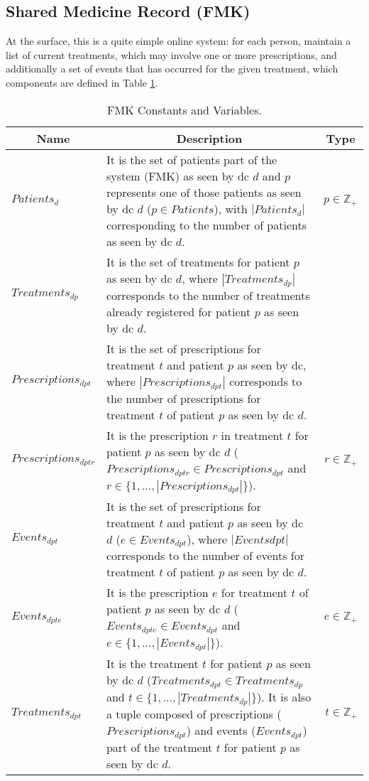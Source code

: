 \subsection{Shared Medicine Record (FMK)}
At the surface, this is a quite simple online system: for each person, maintain a list of current treatments, which may involve one or more prescriptions, and additionally a set of events that has occurred for the given treatment, which components are defined in Table \ref{tab:fmk_constants_variables}.
\begin{table}[!ht]
	\begin{tabular}{|p{2.5cm}|p{11cm}|r| }
		\hline
		\multicolumn{1}{|c|}{Name} & \multicolumn{1}{c|}{Description} & \multicolumn{1}{c|}{Type} \\
		\hline
		\hline
		$Patients_{d}$ & It is the set of patients part of the system (FMK) as seen by \gls{dc} $d$ and $p$ represents one of those patients as seen by \gls{dc} $d$ ($p \in Patients$), with $|Patients_{d}|$ corresponding to the number of patients as seen by \gls{dc} $d$. & $p \in \mathbb{Z}_{+}$ \\
		\hline
		$Treatments_{dp}$ & It is the set of treatments for patient $p$ as seen by \gls{dc} $d$, where $|Treatments_{dp}|$ corresponds to the number of treatments already registered for patient $p$ as seen by \gls{dc} $d$. &  \\
		\hline
		$Prescriptions_{dpt}$ & It is the set of prescriptions for treatment $t$ and patient $p$ as seen by \gls{dc}, where $|Prescriptions_{dpt}|$ corresponds to the number of prescriptions for treatment $t$ of patient $p$ as seen by \gls{dc} $d$. &  \\
		\hline
		$Prescriptions_{dptr}$ & It is the prescription $r$ in treatment $t$ for patient $p$ as seen by \gls{dc} $d$ ($Prescriptions_{dptr} \in Prescriptions_{dpt}$ and $r \in \{1,\dots, |Prescriptions_{dpt}|\}$). & $r \in \mathbb{Z}_{+}$ \\
		\hline
		$Events_{dpt}$ & It is the set of prescriptions for treatment $t$ and patient $p$ as seen by \gls{dc} $d$ ($e \in Events_{dpt}$), where $|Events{dpt}|$ corresponds to the number of events for treatment $t$ of patient $p$ as seen by \gls{dc} $d$. &  \\
		\hline
		$Events_{dpte}$ & It is the prescription $e$ for treatment $t$ of patient $p$ as seen by \gls{dc} $d$ ($Events_{dpte} \in Events_{dpt}$ and $e \in \{1,\dots, |Events_{dpt}|\}$). & $e \in \mathbb{Z}_{+}$ \\
		\hline
		$Treatments_{dpt}$ & It is the treatment $t$ for patient $p$ as seen by \gls{dc} $d$ ($Treatments_{dpt} \in Treatments_{dp}$ and $t \in \{1,\dots, |Treatments_{dp}|\}$). It is also a tuple composed of prescriptions ($Prescriptions_{dpt}$) and events ($Events_{dpt}$) part of the treatment $t$ for patient $p$ as seen by \gls{dc} $d$. & $t \in \mathbb{Z}_{+}$ \\
		\hline
	\end{tabular}
	
	\caption{FMK Constants and Variables.}
	\label{tab:fmk_constants_variables}
\end{table}

